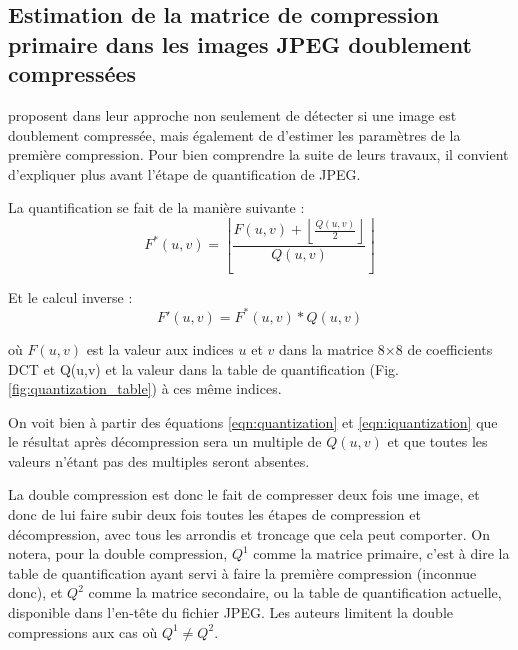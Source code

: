 \documentclass[utf8]{stageM2R} %
\begin{document}
\subsection{Estimation de la matrice de compression primaire dans les images JPEG doublement compressées}



\citeauthor{lukavs2003estimation} \cite{lukavs2003estimation} proposent dans leur approche non seulement de détecter si une image est doublement compressée, mais également de d'estimer les paramètres de la première compression. Pour bien comprendre la suite de leurs travaux, il convient d'expliquer plus avant l'étape de quantification de JPEG.

La quantification se fait de la manière suivante :
\begin{equation}
  F^*(u,v) = \left \lfloor \frac{F(u,v) + \left \lfloor \frac{Q(u,v)}{2} \right \rfloor }{Q(u,v)} \right \rfloor
  \label{eqn:quantization}
\end{equation}

Et le calcul inverse :
\begin{equation}
  F'(u,v) = F^*(u,v) * Q(u,v)
  \label{eqn:iquantization}
\end{equation}

où $F(u,v)$ est la valeur aux indices $u$ et $v$ dans la matrice 8$\times$8 de coefficients DCT et Q(u,v) et la valeur dans la table de quantification (Fig. \ref{fig:quantization_table}) à ces même indices.

On voit bien à partir des équations \ref{eqn:quantization} et \ref{eqn:iquantization} que le résultat après décompression sera un multiple de $Q(u,v)$ et que toutes les valeurs n'étant pas des multiples seront absentes.

La double compression est donc le fait de compresser deux fois une image, et donc de lui faire subir deux fois toutes les étapes de compression et décompression, avec tous les arrondis et troncage que cela peut comporter. On notera, pour la double compression, $Q^{1}$ comme la matrice primaire, c'est à dire la table de quantification ayant servi à faire la première compression (inconnue donc), et $Q^{2}$ comme la matrice secondaire, ou la table de quantification actuelle, disponible dans l'en-tête du fichier JPEG. Les auteurs limitent la double compressions aux cas où $Q^{1} \neq Q^{2}$.
\end{document}
